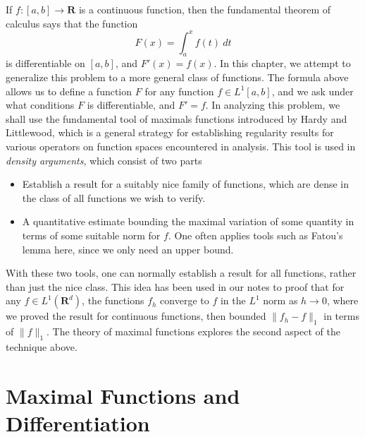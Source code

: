 If $f: [a,b] \to \mathbf{R}$ is a continuous function, then the fundamental theorem of calculus says that the function
%
\[ F(x) = \int_a^x f(t)\ dt \]
%
is differentiable on $[a,b]$, and $F'(x) = f(x)$. In this chapter, we attempt to generalize this problem to a more general class of functions. The formula above allows us to define a function $F$ for any function $f \in L^1[a,b]$, and we ask under what conditions $F$ is differentiable, and $F' = f$. In analyzing this problem, we shall use the fundamental tool of maximals functions introduced by Hardy and Littlewood, which is a general strategy for establishing regularity results for various operators on function spaces encountered in analysis. This tool is used in {\it density arguments}, which consist of two parts
%
\begin{itemize}
  \item Establish a result for a suitably nice family of functions, which are dense in the class of all functions we wish to verify.
  \item A quantitative estimate bounding the maximal variation of some quantity in terms of some suitable norm for $f$. One often applies tools such as Fatou's lemma here, since we only need an upper bound.
\end{itemize}
%
With these two tools, one can normally establish a result for all functions, rather than just the nice class. This idea has been used in our notes to proof that for any $f \in L^1(\mathbf{R}^d)$, the functions $f_h$ converge to $f$ in the $L^1$ norm as $h \to 0$, where we proved the result for continuous functions, then bounded $\| f_h - f \|_1$ in terms of $\| f \|_1$. The theory of maximal functions explores the second aspect of the technique above.

\section{Maximal Functions and Differentiation}


